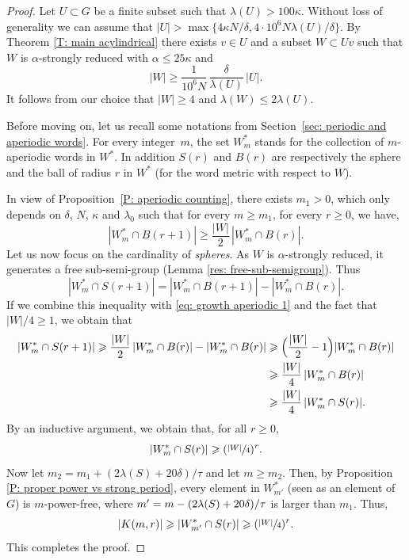 \documentclass[11pt]{article}
\theoremstyle{plain}
\theoremstyle{definition}
\begin{document}
\begin{proof} Let $U\subset G$ be a finite subset such that $\lambda(U)>100 \kappa$.
Without loss of generality we can assume that $|U| > \max\{4\kappa N/\delta, 4\cdot 10^6 N \lambda(U)/\delta\}$.
By Theorem \ref{T: main acylindrical} there exists $v \in U$ and a subset $W \subset Uv$ such that $W$ is $\alpha$-strongly reduced with $\alpha \leq 25\kappa$ and
\begin{equation*}
|W| \geq \frac 1{10^6N}\,\frac \delta{\lambda(U)}\, |U|.
\end{equation*}
It follows from our choice that $|W| \geq 4$ and $\lambda(W) \leq 2 \lambda(U)$.

Before moving on, let us recall some notations from Section~\ref{sec: periodic and aperiodic words}.
For every integer~$m$, the set $W^*_m$ stands for the collection of $m$-aperiodic words in $W^*$.
In addition $S(r)$ and $B(r)$ are respectively the sphere and the ball of radius $r$ in $W^*$ (for the word metric with respect to $W$).

In view of Proposition~\ref{P: aperiodic counting}, there exists $m_1 > 0$, which only depends on $\delta$, $N$, $\kappa$ and $\lambda_0$ such that for every $m \geq m_1$, for every $r \geq 0$, we have,
\begin{equation}
|W^*_m \cap B(r+1)| \geqslant \frac{|W|}2\, |W^*_m \cap B(r)|. \label{eq: growth aperiodic 1}
\end{equation}
Let us now focus on the cardinality of \emph{spheres}.
As $W$ is $\alpha$-strongly reduced, it generates a free sub-semi-group (Lemma \ref{res: free-sub-semigroup}). Thus
\[
|W_m^* \cap S(r+1)| = |W^*_m\cap B(r+1)| -|W_m^* \cap B(r)|.
\]
If we combine this inequality with \eqref{eq: growth aperiodic 1} and the fact that $|W|/4\geqslant 1$, we obtain that
\begin{align*}
|W^*_m \cap S(r+1)|
\geqslant \frac{|W|}2\, |W^*_m \cap B(r)| -|W_m^* \cap B(r)|
&\geqslant \Bigl(\frac{|W|}{2} -1\Bigr) |W^*_m \cap B(r)| \\
& \geqslant \frac{|W|}4\, |W^*_m \cap B(r)| \\
& \geqslant \frac{|W|}4\, |W^*_m \cap S(r)| .
\end{align*}
By an inductive argument, we obtain that, for all $r\geqslant 0$,
\begin{equation*}
|W^*_m \cap S(r)| \geqslant(\sfrac{|W|}{4})^r.
\end{equation*}
Now let $m_2=m_1+(2\lambda(S) + 20\delta)/\tau$ and let $m\geqslant m_2$.
Then, by Proposition \ref{P: proper power vs strong period}, every element in $W^*_{m'}$ (seen as an element of $G$) is $m$-power-free, where $m'=m-(2\lambda(S) +\nobreak 20\delta)/\tau$ is larger than $m_1$.
Thus,
\begin{equation*}
|K(m,r)|\geqslant |W^*_{m'} \cap S(r)| \geqslant(\sfrac{|W|}{4})^{r}.
\end{equation*}
This completes the proof.
\end{proof}
\end{document}
